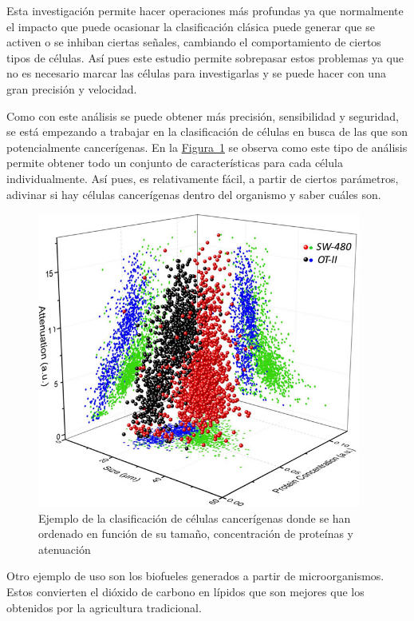 \documentclass[a4paper, 12pt, UTF8]{article}
\begin{document}
Esta investigación permite hacer operaciones más profundas ya que normalmente el impacto que puede ocasionar la clasificación clásica puede generar que se activen o se inhiban ciertas señales, cambiando el comportamiento de ciertos tipos de células. Así pues este estudio permite sobrepasar estos problemas ya que no es necesario marcar las células para investigarlas y se puede hacer con una gran precisión y velocidad.

Como con este análisis se puede obtener más precisión, sensibilidad y seguridad, se está empezando a trabajar en la clasificación de células en busca de las que son potencialmente cancerígenas. En la \hyperref[fig:impacto_1]{Figura~\ref{fig:impacto_1}} se observa como este tipo de análisis permite obtener todo un conjunto de características para cada célula individualmente. 
Así pues, es relativamente fácil, a partir de ciertos parámetros, adivinar si hay células cancerígenas dentro del organismo y saber cuáles son.

\begin{figure}[H]
	\centering
	\includegraphics[width=0.95\textwidth]{impacto_1}
	\caption{Ejemplo de la clasificación de células cancerígenas donde se han ordenado en función de su tamaño, concentración de proteínas y atenuación}
	\label{fig:impacto_1}
\end{figure}

Otro ejemplo de uso son los biofueles generados a partir de microorganismos. Estos convierten el dióxido de carbono en lípidos que son mejores que los obtenidos por la agricultura tradicional. 
\end{document}
